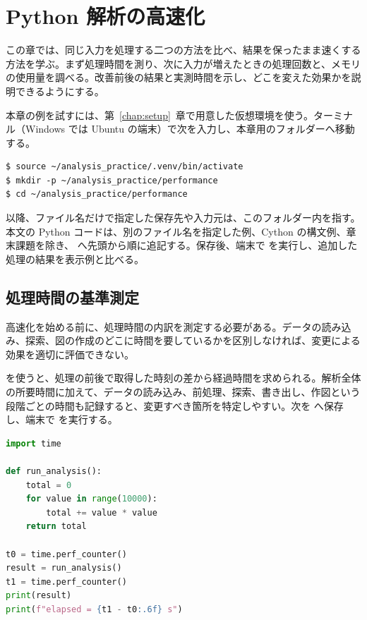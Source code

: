 \chapter{Python 解析の高速化}
\label{chap:performance}

この章では、同じ入力を処理する二つの方法を比べ、結果を保ったまま速くする方法を学ぶ。まず処理時間を測り、次に入力が増えたときの処理回数と、メモリの使用量を調べる。改善前後の結果と実測時間を示し、どこを変えた効果かを説明できるようにする。

本章の例を試すには、第~\ref{chap:setup}~章で用意した仮想環境を使う。ターミナル（Windows では Ubuntu の端末）で次を入力し、本章用のフォルダーへ移動する。

\begin{lstlisting}[numbers=none, xleftmargin=2\zw]
$ source ~/analysis_practice/.venv/bin/activate
$ mkdir -p ~/analysis_practice/performance
$ cd ~/analysis_practice/performance
\end{lstlisting}

以降、ファイル名だけで指定した保存先や入力元は、このフォルダー内を指す。本文の Python コードは、別のファイル名を指定した例、Cython の構文例、章末課題を除き、 へ先頭から順に追記する。保存後、端末で  を実行し、追加した処理の結果を表示例と比べる。

\section{処理時間の基準測定}

高速化を始める前に、処理時間の内訳を測定する必要がある。データの読み込み、探索、図の作成のどこに時間を要しているかを区別しなければ、変更による効果を適切に評価できない。

 を使うと、処理の前後で取得した時刻の差から経過時間を求められる。解析全体の所要時間に加えて、データの読み込み、前処理、探索、書き出し、作図という段階ごとの時間も記録すると、変更すべき箇所を特定しやすい。次を  へ保存し、端末で  を実行する。

\begin{lstlisting}[language=Python]
import time

def run_analysis():
    total = 0
    for value in range(10000):
        total += value * value
    return total

t0 = time.perf_counter()
result = run_analysis()
t1 = time.perf_counter()
print(result)
print(f"elapsed = {t1 - t0:.6f} s")
\end{lstlisting}

